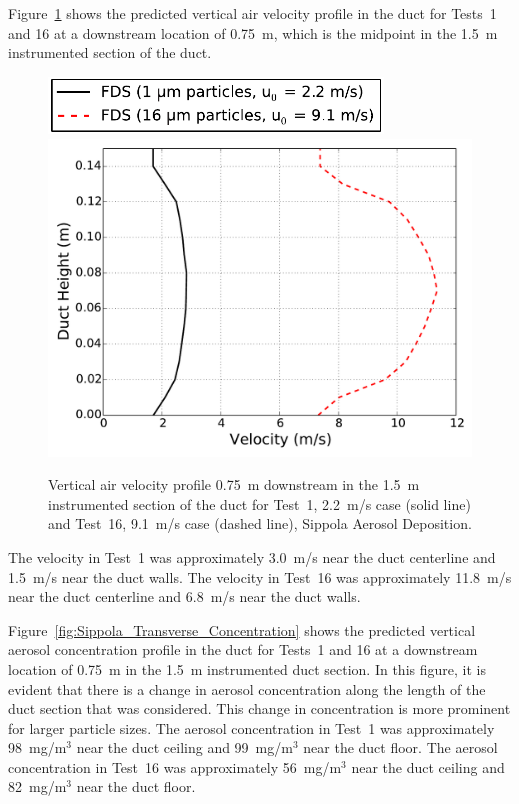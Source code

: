 \noindent Figure~\ref{fig:Sippola_Transverse_Velocity} shows the predicted vertical air velocity profile in the duct for Tests~1 and 16 at a downstream location of 0.75~m, which is the midpoint in the 1.5~m instrumented section of the duct.

\begin{figure}[!ht]
\centering
\includegraphics[width=3.5in]{Fig_Sippola_Aerosol_Deposition_Transverse_Legend.pdf}
\includegraphics[width=5.0in]{Fig_Sippola_Aerosol_Deposition_Transverse_Velocity.pdf}
\caption[Vertical air velocity profile, Sippola Aerosol Deposition]
{Vertical air velocity profile 0.75~m downstream in the 1.5~m instrumented section of the duct for Test~1, 2.2~m/s case (solid line) and Test~16, 9.1~m/s case (dashed line), Sippola Aerosol Deposition.}
\label{fig:Sippola_Transverse_Velocity}
\end{figure}

The velocity in Test~1 was approximately 3.0~m/s near the duct centerline and 1.5~m/s near the duct walls. The velocity in Test~16 was approximately 11.8~m/s near the duct centerline and 6.8~m/s near the duct walls.

\noindent Figure~\ref{fig:Sippola_Transverse_Concentration} shows the predicted vertical aerosol concentration profile in the duct for Tests~1 and 16 at a downstream location of 0.75~m in the 1.5~m instrumented duct section. In this figure, it is evident that there is a change in aerosol concentration along the length of the duct section that was considered. This change in concentration is more prominent for larger particle sizes. The aerosol concentration in Test~1 was approximately 98~mg/m$^3$ near the duct ceiling and 99~mg/m$^3$ near the duct floor. The aerosol concentration in Test~16 was approximately 56~mg/m$^3$ near the duct ceiling and 82~mg/m$^3$ near the duct floor.

